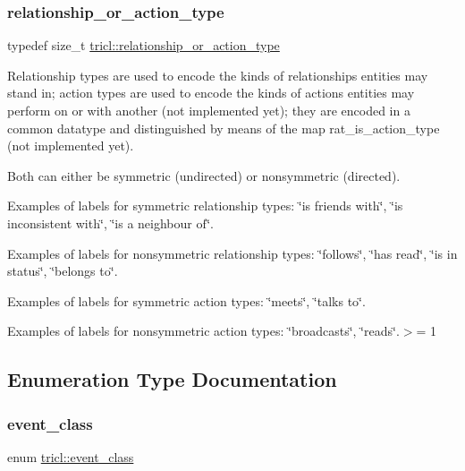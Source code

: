 \subsubsection{\texorpdfstring{relationship\+\_\+or\+\_\+action\+\_\+type}{relationship\_or\_action\_type}}
{\footnotesize\ttfamily typedef size\+\_\+t \hyperlink{namespacetricl_a2d01894944fb58a8fedc0912a48d13f8}{tricl\+::relationship\+\_\+or\+\_\+action\+\_\+type}}



Relationship types are used to encode the kinds of relationships entities may stand in; action types are used to encode the kinds of actions entities may perform on or with another (not implemented yet); they are encoded in a common datatype and distinguished by means of the map rat\+\_\+is\+\_\+action\+\_\+type (not implemented yet). 

Both can either be symmetric (undirected) or nonsymmetric (directed).

Examples of labels for symmetric relationship types\+: \char`\"{}is friends with\char`\"{}, \char`\"{}is inconsistent with\char`\"{}, \char`\"{}is a neighbour of\char`\"{}.

Examples of labels for nonsymmetric relationship types\+: \char`\"{}follows\char`\"{}, \char`\"{}has read\char`\"{}, \char`\"{}is in status\char`\"{}, \char`\"{}belongs to\char`\"{}.

Examples of labels for symmetric action types\+: \char`\"{}meets\char`\"{}, \char`\"{}talks to\char`\"{}.

Examples of labels for nonsymmetric action types\+: \char`\"{}broadcasts\char`\"{}, \char`\"{}reads\char`\"{}.$>$= 1 

\subsection{Enumeration Type Documentation}
\mbox{\label{namespacetricl_a6967089e2c0837f273d8cb5fd9f7e46d}} 
\subsubsection{\texorpdfstring{event\+\_\+class}{event\_class}}
{\footnotesize\ttfamily enum \hyperlink{namespacetricl_a6967089e2c0837f273d8cb5fd9f7e46d}{tricl\+::event\+\_\+class}}



